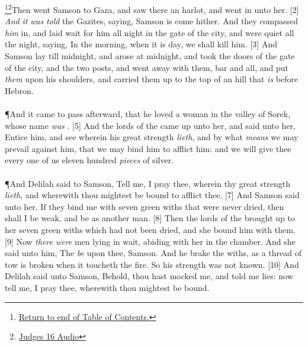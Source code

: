 \footnote{\textcolor[rgb]{0.00,0.25,0.00}{\hyperlink{JudgesTOC}{Return to end of Table of Contents.}}}\footnote{\href{https://audiobible.com/bible/judges_16.html}{\textcolor[cmyk]{0.99998,1,0,0}{Judges 16 Audio}}}\textcolor[cmyk]{0.99998,1,0,0}{Then went Samson to Gaza, and saw there an harlot, and went in unto her.}
[2] \textcolor[cmyk]{0.99998,1,0,0}{\emph{And} \emph{it} \emph{was} \emph{told} the Gazites, saying, Samson is come hither. And they compassed \emph{him} in, and laid wait for him all night in the gate of the city, and were quiet all the night, saying, In the morning, when it is day, we shall kill him.}
[3] \textcolor[cmyk]{0.99998,1,0,0}{And Samson lay till midnight, and arose at midnight, and took the doors of the gate of the city, and the two posts, and went away with them, bar and all, and put \emph{them} upon his shoulders, and carried them up to the top of an hill that \emph{is} before Hebron.}\\
\\
\P \textcolor[cmyk]{0.99998,1,0,0}{And it came to pass afterward, that he loved a woman in the valley of Sorek, whose name \emph{was} .}
[5] \textcolor[cmyk]{0.99998,1,0,0}{And the lords of the  came up unto her, and said unto her, Entice him, and see wherein his great strength \emph{lieth}, and by what \emph{means} we may prevail against him, that we may bind him to afflict him: and we will give thee every one of us eleven hundred \emph{pieces} of silver.}\\
\\
\P \textcolor[cmyk]{0.99998,1,0,0}{And Delilah said to Samson, Tell me, I pray thee, wherein thy great strength \emph{lieth}, and wherewith thou mightest be bound to afflict thee.}
[7] \textcolor[cmyk]{0.99998,1,0,0}{And Samson said unto her, If they bind me with seven green withs that were never dried, then shall I be weak, and be as another man.}
[8] \textcolor[cmyk]{0.99998,1,0,0}{Then the lords of the  brought up to her seven green withs which had not been dried, and she bound him with them.}
[9] \textcolor[cmyk]{0.99998,1,0,0}{Now \emph{there} \emph{were} men lying in wait, abiding with her in the chamber. And she said unto him, The  \emph{be} upon thee, Samson. And he brake the withs, as a thread of tow is broken when it toucheth the fire. So his strength was not known.}
[10] \textcolor[cmyk]{0.99998,1,0,0}{And Delilah said unto Samson, Behold, thou hast mocked me, and told me lies: now tell me, I pray thee, wherewith thou mightest be bound.}
